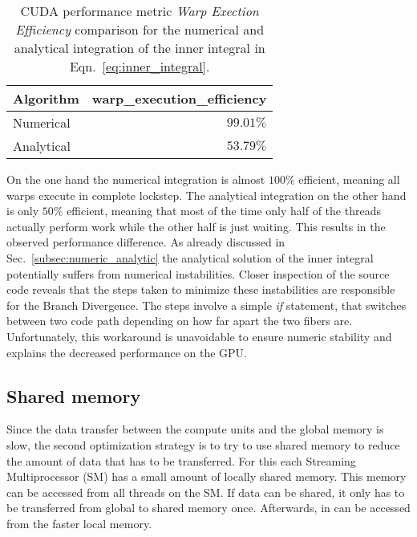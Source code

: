 \begin{table}[!htbp]
  \begin{center}
    \begin{tabulary}{0.7\textwidth}{LR}
      \toprule
      Algorithm & warp\_execution\_efficiency \\
      \midrule
      Numerical & $99.01\%$ \\
      Analytical & $53.79\%$ \\
      \bottomrule
    \end{tabulary}
  \end{center}
  \caption[Warp Execution Efficiency of Numerical vs. Analytical Integration.]{CUDA performance metric \emph{Warp Exection Efficiency} comparison for the numerical and analytical integration of the inner integral in Eqn.~\eqref{eq:inner_integral}.}
  \label{tab:branch_divergence}
\end{table}

On the one hand the numerical integration is almost $100\%$ efficient, meaning all warps execute in complete lockstep. The analytical integration on the other hand is only $50\%$ efficient, meaning that most of the time only half of the threads actually perform work while the other half is just waiting. This results in the observed performance difference. As already discussed in Sec.~\ref{subsec:numeric_analytic} the analytical solution of the inner integral potentially suffers from numerical instabilities. Closer inspection of the source code reveals that the steps taken to minimize these instabilities are responsible for the Branch Divergence. The steps involve a simple \emph{if} statement, that switches between two code path depending on how far apart the two fibers are. Unfortunately, this workaround is unavoidable to ensure numeric stability and explains the decreased performance on the GPU.

\subsection{Shared memory}
\label{subsec:bench_shared_memory}

Since the data transfer between the compute units and the global memory is slow, the second optimization strategy is to try to use shared memory to reduce the amount of data that has to be transferred. For this each Streaming Multiprocessor (SM) has a small amount of locally shared memory. This memory can be accessed from all threads on the SM. If data can be shared, it only has to be transferred from global to shared memory once. Afterwards, in can be accessed from the faster local memory.

